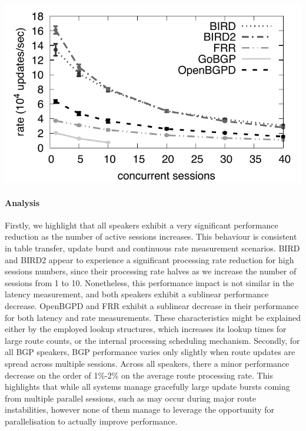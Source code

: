 \begin{minipage}[c]{.49\linewidth}
	\centering
	\includegraphics[width=\linewidth]{images/msrt-scalability.pdf}
	 \label{fig:msrt-scalability}
\end{minipage}
\vspace{1em}

\paragraph{\textbf{Analysis}}
Firstly, we highlight that all speakers exhibit a very significant performance reduction as the number of active sessions increases.
This behaviour is consistent in table transfer, update burst and continuous rate measurement scenarios.
BIRD and BIRD2 appear to experience a significant processing rate reduction for high sessions numbers, since their processing rate halves as we increase the number of sessions from 1 to 10.
Nonetheless, this performance impact is not similar in the latency measurement, and both speakers exhibit a sublinear performance decrease.
OpenBGPD and FRR exhibit a sublinear decrease in their performance for both latency and rate measurements.
These characteristics might be explained either by the employed lookup structures, which increases its lookup times for large route counts, or the internal processing scheduling mechanism.
Secondly, for all BGP speakers, BGP performance varies only slightly when route updates are spread across multiple sessions.
Across all speakers, there a minor performance decrease on the order of 1\%-2\% on the average route processing rate.
This highlights that while all systems manage gracefully large update bursts coming from multiple parallel sessions, such as may occur during major route instabilities, however none of them manage to leverage the opportunity for parallelisation to actually improve performance.


